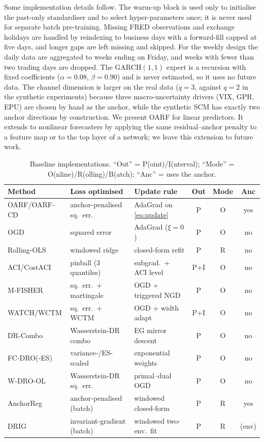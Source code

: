 \documentclass[12pt]{article}
\theoremstyle{plain}
\theoremstyle{remark}
\newcommand{\OARF}{\textsc{OARF}}
\newcommand{\OARFCD}{\textsc{OARF-CD}}
\begin{document}
Some implementation details follow. The warm-up block is used only to initialise the
past-only standardiser and to select hyper-parameters once; it is never used for
separate batch pre-training. Missing FRED observations and exchange holidays are
handled by reindexing to business days with a forward-fill capped at five days, and
longer gaps are left missing and skipped. For the weekly design the daily data are
aggregated to weeks ending on Friday, and weeks with fewer than two trading days are
dropped. The GARCH$(1,1)$ expert is a
recursion with fixed coefficients ($\alpha=0.08$, $\beta=0.90$) and is never
estimated, so it uses no future data. The channel dimension is larger on the real data ($q=3$,
against $q=2$ in the synthetic experiments) because three macro-uncertainty drivers
(VIX, GPR, EPU) are chosen by hand as the anchor, while the synthetic SCM has exactly
two anchor directions by construction. We present \OARF{} for linear predictors. It
extends to nonlinear forecasters by applying the same residual--anchor penalty to a
feature map or to the top layer of a network; we leave this extension to future work.

\begin{table}[htbp]
\centering
\caption{Baseline implementations. ``Out'' = P(oint)/I(nterval); ``Mode'' =
O(nline)/R(olling)/B(atch); ``Anc'' = uses the anchor.}
\label{tab:baseimpl}
\small
\begin{tabular}{lllccc}
\toprule
Method & Loss optimised & Update rule & Out & Mode & Anc\\
\midrule
\OARF{}/\OARFCD{} & anchor-penalised sq.\ err. & AdaGrad on \eqref{eq:update} & P & O & yes\\
OGD & squared error & AdaGrad ($\xi=0$) & P & O & no\\
Rolling-OLS & windowed ridge & closed-form refit & P & R & no\\
ACI/CostACI & pinball (3 quantiles) & subgrad.\ + ACI level & P+I & O & no\\
M-FISHER & sq.\ err.\ + martingale & OGD + triggered NGD & P & O & no\\
WATCH/WCTM & sq.\ err.\ + WCTM & OGD + width adapt & P+I & O & no\\
DR-Combo & Wasserstein-DR combo & EG mirror descent & P & O & no\\
FC-DRO(-ES) & variance-/ES-scaled & exponential weights & P & O & no\\
W-DRO-OL & Wasserstein-DR sq.\ err. & primal--dual OGD & P & O & no\\
AnchorReg & anchor-penalised (batch) & windowed closed-form & P & R & yes\\
DRIG & invariant-gradient (batch) & windowed two-env.\ fit & P & R & (env)\\
\bottomrule
\end{tabular}
\end{table}
\end{document}
